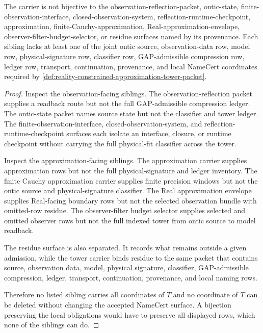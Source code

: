 \begin{theorem}
\label{thm:reality-constrained-approximation-tower-sibling-independence}
The \RealityConstrainedApproximationTowerUp carrier is not bijective to the observation-reflection-packet, ontic-state, finite-observation-interface, closed-observation-system, reflection-runtime-checkpoint, approximation, finite-Cauchy-approximation, Real-approximation-envelope, observer-filter-budget-selector, or residue surfaces named by its provenance. Each sibling lacks at least one of the joint ontic source, observation-data row, model row, physical-signature row, classifier row, GAP-admissible compression row, ledger row, transport, continuation, provenance, and local NameCert coordinates required by \autoref{def:reality-constrained-approximation-tower-packet}.
\end{theorem}
\begin{proof}
Inspect the observation-facing siblings. The observation-reflection packet supplies a readback route but not the full GAP-admissible compression ledger. The ontic-state packet names source state but not the classifier and tower ledger. The finite-observation-interface, closed-observation-system, and reflection-runtime-checkpoint surfaces each isolate an interface, closure, or runtime checkpoint without carrying the full physical-fit classifier across the tower.

Inspect the approximation-facing siblings. The approximation carrier supplies approximation rows but not the full physical-signature and ledger inventory. The finite Cauchy approximation carrier supplies finite precision windows but not the ontic source and physical-signature classifier. The Real approximation envelope supplies Real-facing boundary rows but not the selected observation bundle with omitted-row residue. The observer-filter budget selector supplies selected and omitted observer rows but not the full indexed tower from ontic source to model readback.

The residue surface is also separated. It records what remains outside a given admission, while the tower carrier binds residue to the same packet that contains source, observation data, model, physical signature, classifier, GAP-admissible compression, ledger, transport, continuation, provenance, and local naming rows.

Therefore no listed sibling carries all coordinates of $T$ and no coordinate of $T$ can be deleted without changing the accepted NameCert surface. A bijection preserving the local obligations would have to preserve all displayed rows, which none of the siblings can do.
\end{proof}

